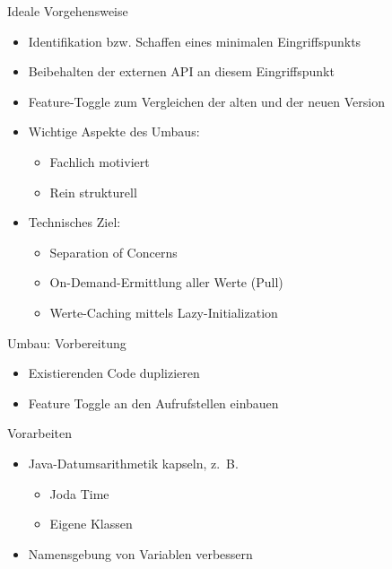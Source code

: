 \begin{frame}[fragile]{Ideale Vorgehensweise}
\begin{itemize}
\item Identifikation bzw. Schaffen eines minimalen Eingriffspunkts
\item Beibehalten der externen API an diesem Eingriffspunkt
\item Feature-Toggle zum Vergleichen der alten und der neuen Version

\item Wichtige Aspekte des Umbaus:
\begin{itemize}
\item Fachlich motiviert
\item Rein strukturell
\end{itemize}

\item Technisches Ziel:
\begin{itemize}
\item Separation of Concerns
\item On-Demand-Ermittlung aller Werte (\glqq Pull\grqq{})
\item Werte-Caching mittels Lazy-Initialization
\end{itemize}

\end{itemize}
\end{frame}




\begin{frame}[fragile]{Umbau: Vorbereitung}
\begin{itemize}
\item Existierenden Code duplizieren
\item Feature Toggle an den Aufrufstellen einbauen
\end{itemize}
\end{frame}
 
\begin{frame}[fragile]{Vorarbeiten}
\begin{itemize}
\item Java-Datumsarithmetik kapseln, z.~B.
\begin{itemize}
\item Joda Time
\item Eigene Klassen
\end{itemize}
\item Namensgebung von Variablen verbessern
\end{itemize}
\end{frame}

